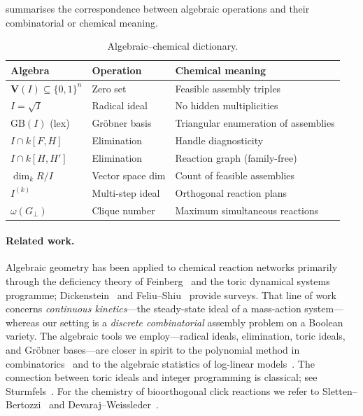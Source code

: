 \documentclass[preprint,12pt]{elsarticle}
\theoremstyle{definition}
\theoremstyle{remark}
\newcommand{\kk}{k}
\newcommand{\Var}{\mathbf{V}}
\newcommand{\GB}{\mathrm{GB}}
\begin{document}
 summarises the correspondence between
algebraic operations and their combinatorial or chemical meaning.

\begin{table}[ht]
\centering
\caption{Algebraic--chemical dictionary.}
\label{tab:dictionary}
\begin{tabular}{@{}lll@{}}
\toprule
\textbf{Algebra} & \textbf{Operation} & \textbf{Chemical meaning} \\
\midrule
$\Var(I) \subseteq \{0,1\}^n$ & Zero set & Feasible assembly triples \\
$I = \sqrt{I}$ & Radical ideal & No hidden multiplicities \\
$\GB(I)$ (lex) & Gr\"obner basis & Triangular enumeration of assemblies \\
$I \cap \kk[F, H]$ & Elimination & Handle diagnosticity \\
$I \cap \kk[H, H']$ & Elimination & Reaction graph (family-free) \\
$\dim_\kk R/I$ & Vector space dim & Count of feasible assemblies \\
$I^{(k)}$ & Multi-step ideal & Orthogonal reaction plans \\
$\omega(G_\perp)$ & Clique number & Maximum simultaneous reactions \\
\bottomrule
\end{tabular}
\end{table}


\paragraph{Related work.}
Algebraic geometry has been applied to chemical reaction networks
primarily through the deficiency theory of Feinberg~\cite{Feinberg19}
and the toric dynamical systems programme; Dickenstein~\cite{Dickenstein16}
and Feliu--Shiu~\cite{FeliuShiu25} provide surveys.  That line of
work concerns \emph{continuous
kinetics}---the steady-state ideal of a mass-action system---whereas
our setting is a \emph{discrete combinatorial} assembly problem on a
Boolean variety.  The algebraic tools we employ---radical ideals,
elimination, toric ideals, and Gr\"obner bases---are closer in
spirit to the polynomial method in combinatorics~\cite{CLO15} and to
the algebraic statistics of log-linear
models~\cite{PS05,DSS09}.  The connection between toric ideals and
integer programming is classical; see Sturmfels~\cite{Sturmfels96}.
For the chemistry of bioorthogonal click reactions we refer to
Sletten--Bertozzi~\cite{Sletten09} and
Devaraj--Weissleder~\cite{Devaraj11}.
\end{document}
